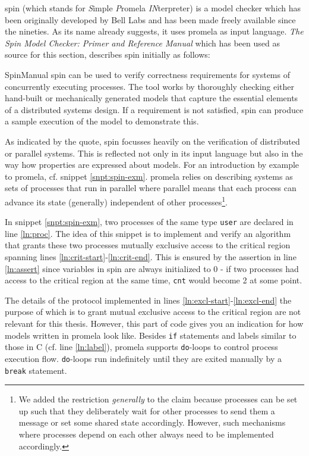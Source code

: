 \gls{spin} (which stands for \textit{S}imple \textit{P}romela \textit{IN}terpreter) is a model checker which has been originally developed by Bell Labs and has been made freely available since the nineties.
As its name already suggests, it uses \gls{promela} as input language.
\textit{The Spin Model Checker: Primer and Reference Manual} which has been used as source for this section, describes \gls{spin} initially as follows:
\begin{displaycquote}[p.1]{SpinManual}
    \gls{spin} can be used to verify correctness requirements for systems of concurrently executing processes.
    The tool works by thoroughly checking either hand-built or mechanically generated models that capture the essential elements of a distributed systems design.
    If a requirement is not satisfied, \gls{spin} can produce a sample execution of the model to demonstrate this.
\end{displaycquote}

As indicated by the quote, \gls{spin} focusses heavily on the verification of distributed or parallel systems.
This is reflected not only in its input language but also in the way how properties are expressed about models.
For an introduction by example to \gls{promela}, cf. snippet \ref{snpt:spin-exm}.
\gls{promela} relies on describing systems as sets of processes that run in parallel where parallel means that each process can advance its state (generally) independent of other processes\footnote{%
    We added the restriction \textit{generally} to the claim because processes can be set up such that they deliberately wait for other processes to send them a message or set some shared state accordingly.
    However, such mechanisms where processes depend on each other always need to be implemented accordingly.
}.

In snippet \ref{snpt:spin-exm}, two processes of the same type \lstinline{user} are declared in line \ref{ln:proc}.
The idea of this snippet is to implement and verify an algorithm that grants these two processes mutually exclusive access to the critical region spanning lines \ref{ln:crit-start}-\ref{ln:crit-end}.
This is ensured by the assertion in line \ref{ln:assert} since variables in \gls{spin} are always initialized to 0 - if two processes had access to the critical region at the same time, \lstinline{cnt} would become 2 at some point.

The details of the protocol implemented in lines \ref{ln:excl-start}-\ref{ln:excl-end} the purpose of which is to grant mutual exclusive access to the critical region are not relevant for this thesis.
However, this part of code gives you an indication for how models written in \gls{promela} look like.
Besides \lstinline{if} statements and labels similar to those in C (cf. line \ref{ln:label}), \gls{promela} supports \lstinline{do}-loops to control process execution flow.
\lstinline{do}-loops run indefinitely until they are exited manually by a \lstinline{break} statement.

